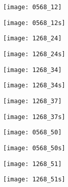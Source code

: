 \texttt{[image: 0568\_12]}

\texttt{[image: 0568\_12s]}

\texttt{[image: 1268\_24]}

\texttt{[image: 1268\_24s]}

\texttt{[image: 1268\_34]}

\texttt{[image: 1268\_34s]}

\texttt{[image: 1268\_37]}

\texttt{[image: 1268\_37s]}

\texttt{[image: 0568\_50]}

\texttt{[image: 0568\_50s]}

\texttt{[image: 1268\_51]}

\texttt{[image: 1268\_51s]}

%

%
%
%
%
%

%



